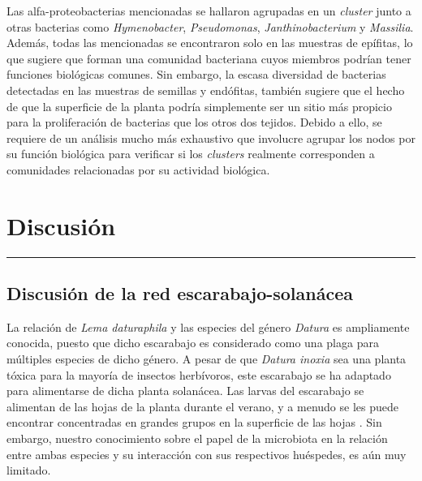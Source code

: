 \documentclass[
]{book}
\begin{document}
Las alfa-proteobacterias mencionadas se hallaron agrupadas en un \emph{cluster} junto a otras bacterias como \emph{Hymenobacter}, \emph{Pseudomonas}, \emph{Janthinobacterium} y \emph{Massilia}. Además, todas las mencionadas se encontraron solo en las muestras de epífitas, lo que sugiere que forman una comunidad bacteriana cuyos miembros podrían tener funciones biológicas comunes. Sin embargo, la escasa diversidad de bacterias detectadas en las muestras de semillas y endófitas, también sugiere que el hecho de que la superficie de la planta podría simplemente ser un sitio más propicio para la proliferación de bacterias que los otros dos tejidos. Debido a ello, se requiere de un análisis mucho más exhaustivo que involucre agrupar los nodos por su función biológica para verificar si los \emph{clusters} realmente corresponden a comunidades relacionadas por su actividad biológica.

\hypertarget{discusiuxf3n}{%
\chapter*{Discusión}\label{discusiuxf3n}}

\begin{center}\rule{0.5\linewidth}{0.5pt}\end{center}

\hypertarget{discusiuxf3n-de-la-red-escarabajo-solanuxe1cea}{%
\section*{Discusión de la red escarabajo-solanácea}\label{discusiuxf3n-de-la-red-escarabajo-solanuxe1cea}}

La relación de \emph{Lema daturaphila} y las especies del género \emph{Datura} es ampliamente conocida, puesto que dicho escarabajo es considerado como una plaga para múltiples especies de dicho género. A pesar de que \emph{Datura inoxia} sea una planta tóxica para la mayoría de insectos herbívoros, este escarabajo se ha adaptado para alimentarse de dicha planta solanácea. Las larvas del escarabajo se alimentan de las hojas de la planta durante el verano, y a menudo se les puede encontrar concentradas en grandes grupos en la superficie de las hojas \citep{goldberg2020towards}. Sin embargo, nuestro conocimiento sobre el papel de la microbiota en la relación entre ambas especies y su interacción con sus respectivos huéspedes, es aún muy limitado.
\end{document}
